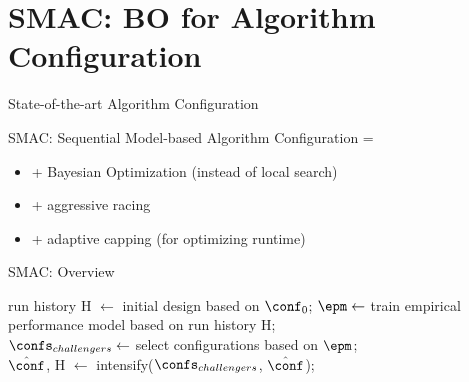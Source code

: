 \section{SMAC: BO for Algorithm Configuration}

\begin{frame}[c]{State-of-the-art Algorithm Configuration}

SMAC: Sequential Model-based Algorithm Configuration =

\begin{itemize}
	\item + Bayesian Optimization (instead of local search)
	\item + aggressive racing
	\item + adaptive capping (for optimizing runtime)
\end{itemize}

\end{frame}
\begin{frame}[c]{SMAC: Overview}

\LinesNotNumbered
\begin{algorithm}[H]
	\BlankLine
	run history H $\leftarrow$ initial design based on $\conf_0$; 
	 {
		\pause
		$\epm \leftarrow$ train empirical performance model based on run history H;\\
		\pause
		$\confs_{challengers} \leftarrow$ select configurations based on $\epm$;\\
		\pause
		$\hat{\conf}$, H $\leftarrow$ intensify($\confs_{challengers}$, $\hat{\conf}$); 
	}
	\pause
	\Return{$\hat{\conf}$}
	\caption{SMAC}
\end{algorithm}

\end{frame}

